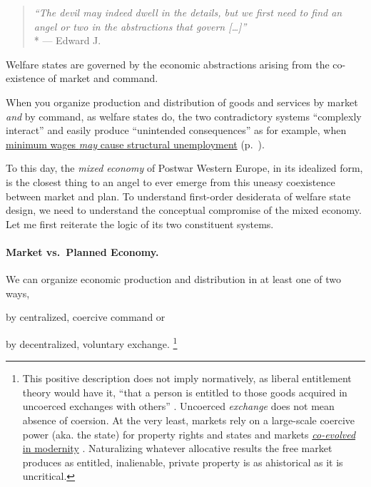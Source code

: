 \begin{quote}
	\emph{``The devil may indeed dwell in the details, but we first need to find an angel or two in the abstractions that govern [\ldots]''}
	\\*
	--- Edward J.\ \citet[loc.~117]{McCaffery2002}
\end{quote}

Welfare states are governed by the economic abstractions arising from the co-existence of market and command.

When you organize production and distribution of goods and services by market \emph{and} by command, as welfare states do, the two contradictory systems ``complexly interact'' \citep{Perrow-1999-aa} and easily produce ``unintended consequences'' \citep{Merton-1936-aa} as for example, when \hyperref[sec:price-floors]{minimum wages \emph{may} cause structural unemployment} (p.~\pageref{sec:price-floors}).

To this day, the \emph{mixed economy} of Postwar Western Europe, in its idealized form, is the closest thing to an angel to ever emerge from this uneasy coexistence between market and plan.
To understand first-order desiderata of welfare state design, we need to understand the conceptual compromise of the mixed economy.
Let me first reiterate the logic of its two constituent systems.

\paragraph[Market vs.\ Plan]{Market vs.\ Planned Economy.}
	\label{sec:market-vs-command}

We can organize economic production and distribution in at least one of two ways,
\begin{inparaenum}
	\item by centralized, coercive command or

	\item by decentralized, voluntary exchange.
	\footnote{
	\label{fn:tilly} This positive description does not imply normatively, as liberal entitlement theory would have it, ``that a person is entitled to those goods acquired in uncoerced exchanges with others'' \citep[149]{Nozick1974,Friedman1962}.
	Uncoerced \emph{exchange} does not mean absence of coersion.
	At the very least, markets rely on a large-scale coercive power (aka. the state) for property rights and states and markets \hyperref[sec:modernity]{\emph{co-evolved} in modernity} \citep{Tilly-1985-aa}.
	Naturalizing whatever allocative results the free market produces as entitled, inalienable, private property is as ahistorical as it is uncritical.
	}
\end{inparaenum}

